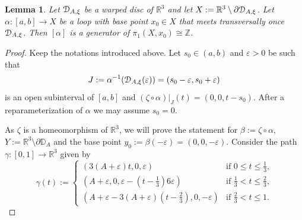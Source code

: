 \documentclass[10pt,twoside]{homg3} %
\newtheorem{lem}[thm]{Lemma}
\newcommand{\Dd}{{\EuScript D}}
\renewcommand{\R}{\mathbb{R}}
\begin{document}
\begin{lem}\label{lem2}
Let $\Dd_{A,\xi}$ be a warped disc of $\R^3$ and let $X:=\R^3\setminus\partial\Dd_{A,\xi}$. Let $\alpha:[a,b]\to X$ be a loop with base point $x_0\in X$ that meets transversally once $\Dd_{A,\xi}$. Then $[\alpha]$ is a generator of $\pi_1(X,x_0)\cong{\mathbb Z}$.
\end{lem}
\begin{proof} 
Keep the notations introduced above. Let $s_0\in(a,b)$ and $\varepsilon>0$ be such that 
$$
J:=\alpha^{-1}(\Dd_{A,\xi}(\varepsilon))=(s_0-\varepsilon,s_0+\varepsilon)
$$ 
is an open subinterval of $[a,b]$ and $(\zeta\circ\alpha)|_J(t)=(0,0,t-s_0)$. After a reparameterization of $\alpha$ we may assume $s_0=0$.

As $\zeta$ is a homeomorphism of $\R^3$, we will prove the statement for $\beta:=\zeta\circ\alpha$, $Y:=\R^3\setminus\partial{\mathbb D}_A$ and the base point $y_0:=\beta(-\varepsilon)=(0,0,-\varepsilon)$. Consider the path $\gamma:[0,1]\rightarrow\R^3$ given by
$$
\gamma(t):=
\begin{cases}
(3(A+\varepsilon)t,0,\varepsilon)&\text{if $0\le t\le\frac{1}{3}$,}\\
(A+\varepsilon, 0, \varepsilon-(t-\frac{1}{3})6\varepsilon)&\text{if $\frac{1}{3}<t\le \frac{2}{3}$,}\\
(A+\varepsilon-3(A+\varepsilon)(t-\frac{2}{3}), 0, -\varepsilon)&\text{if $\frac{2}{3}<t\le 1$}.
\end{cases}
$$


\end{proof}
\end{document}
